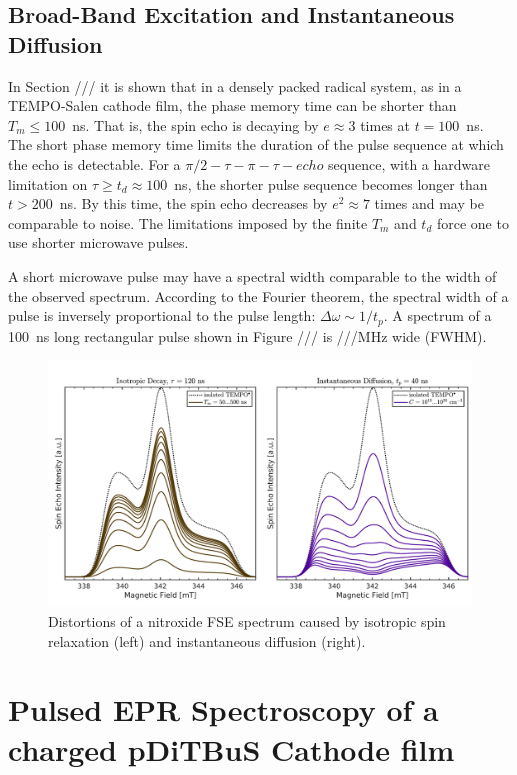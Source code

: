 \subsection{Broad-Band Excitation and Instantaneous Diffusion}
In Section /// it is shown that in a densely packed radical system, as in a TEMPO-Salen cathode film, the phase memory time can be shorter than $T_m\leq100$~ns. That is, the spin echo is decaying by $e\approx3$ times at $t=100$~ns. The short phase memory time limits the duration of the pulse sequence at which the echo is detectable. For a $\pi/2-\tau-\pi-\tau-echo$ sequence, with a hardware limitation on $\tau\geq t_d\approx100$~ns, the shorter pulse sequence becomes longer than $t>200$~ns. By this time, the spin echo decreases by $e^2\approx7$ times and may be comparable to noise. The limitations imposed by the finite $T_m$ and $t_d$ force one to use shorter microwave pulses. 
\par
A short microwave pulse may have a spectral width comparable to the width of the observed spectrum. According to the Fourier theorem, the spectral width of a pulse is inversely proportional to the pulse length: $\Delta\omega\sim 1/t_p$. A spectrum of a 100~ns long rectangular pulse shown in Figure /// is ///MHz wide (FWHM). 

\begin{figure}[h]
\center
	\includegraphics[width=1\textwidth]{./pulse/figures/FGMR/ID/ID_vs_ISO.pdf}
	\caption{Distortions of a nitroxide FSE spectrum caused by isotropic spin relaxation (left) and instantaneous diffusion (right).}
	\label{fig:iso_vs_id}
\end{figure}


\section{Pulsed EPR Spectroscopy of a charged pDiTBuS Cathode film}


